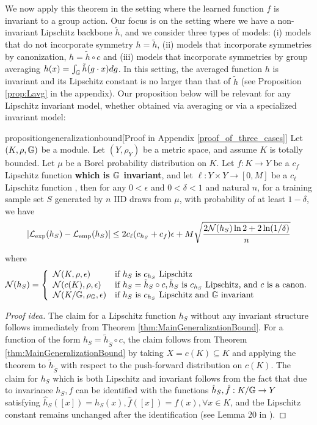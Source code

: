 \documentclass{article}
\begin{document}
We now apply this theorem in the setting where the learned function $f$ is invariant to a group action. Our focus is on the setting where we have a non-invariant Lipschitz backbone $\tilde h$, and we consider three types of models: (i) models that do not incorporate symmetry $h=\tilde h$, (ii) models that incorporate symmetries by canonization, $h= \tilde h \circ c $ and (iii) models that incorporate symmetries by group averaging $h(x)=\int_{\mathbb{G}} \tilde{h}(g\cdot x)dg $. In this setting, the averaged function $h$ is invariant and its Lipschitz constant is no larger than that of $\tilde h$ (see Proposition \ref{prop:Lavg} in the appendix).
Our proposition below will be relevant for any Lipschitz invariant model, whether obtained via averaging or via a specialized invariant model: 
\begin{restatable}{proposition}{generalizationbound}[Proof  in Appendix \ref{proof_of_three_cases}]
\label{propGen}
Let $(K,\rho,\mathbb{G})$ be a module. Let $(Y,\rho_Y) $ be a metric space, and assume $K$ is totally bounded. Let $\mu$ be a Borel probability distribution on $K$. Let $f:K\to Y $ be a $c_f$  Lipschitz function \textbf{which is $\mathbb{G} $ invariant}, and let $\ell:Y\times Y \to [0,M] $ be a $c_\ell $ Lipschitz function , then for any $0<\epsilon$ and $0<\delta<1$ and natural $n$, for a training sample set $S$ generated by $n$ IID draws from $\mu$,  with probability of at least $ 1-\delta$, we have 
$$|\mathcal{L}_{\mathrm{exp}}(h_S) - \mathcal{L}_{\mathrm{emp}}(h_S)| \le 2c_\ell (c_{h_S}+c_f)\epsilon+M \sqrt{\frac{2\mathcal{N}(h_S) \ln 2 + 2 \ln(1/\delta)}{n}}$$

where 
\begin{equation}\label{eq:differentN}
\mathcal{N}(h_S)=\left\{ \begin{array}{lll} \mathcal{N}(K,\rho,\epsilon) & \mbox{if } h_S \text{ is } c_{h_S} \text{ Lipschitz } \\ \mathcal{N}(c(K),\rho,\epsilon) & \mbox{if } h_S=\tilde{h}_S\circ c, \tilde{h}_S \text { is } c_{h_S} \text{ Lipschitz, and }  c \text{ is a canon.} \\ \mathcal{N}(K/\mathbb{G},\rho_{\mathbb{G}},\epsilon) & \mbox{if } h_S \text{ is } c_{h_S} \text{ Lipschitz and  } \mathbb{G} \text{ invariant } \end{array} \right. 
\end{equation}
\end{restatable}

\begin{proof}[Proof idea]
The claim for a Lipschitz function $h_S$ without any invariant structure follows immediately from Theorem \ref{thm:MainGeneralizationBound}. For a function of the form $h_S=\tilde h_{\tilde S}\circ c$, the claim follows from Theorem \ref{thm:MainGeneralizationBound} by taking $X=c(K)\subseteq K$ and applying the theorem to $\tilde h_{\tilde S}$ with respect to the push-forward distribution on $c(K)$.
The claim for $h_S$ which is both Lipschitz and invariant follows from the fact that due to invariance $h_S, f$ can be identified with the functions $\hat h_S, \hat f : K/\mathbb{G} \to Y $ satisfying $\hat h_S([x])=h_S(x), \hat f([x])=f(x), \forall x\in K $, and the Lipschitz constant remains unchanged after the identification (see Lemma 20 in \cite{siegel2026quantitativeapproximationratesgroup}).
\end{proof}
\end{document}
